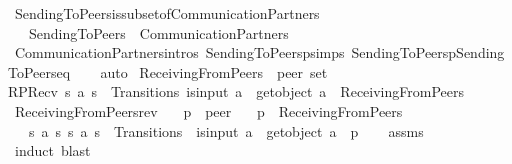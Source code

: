 \begin{isabellebody}
\ SendingToPeers{\isacharunderscore}{\kern0pt}is{\isacharunderscore}{\kern0pt}subset{\isacharunderscore}{\kern0pt}of{\isacharunderscore}{\kern0pt}CommunicationPartners{\isacharcolon}{\kern0pt}\isanewline
\ \ \ {\isachardoublequoteopen}SendingToPeers\ {\isasymsubseteq}\ CommunicationPartners{\isachardoublequoteclose}\isanewline
%
\isadelimproof
\ \ %
\endisadelimproof
%
\isatagproof
{}\isamarkupfalse%
\ CommunicationPartners{\isachardot}{\kern0pt}intros\ SendingToPeersp{\isachardot}{\kern0pt}simps\ SendingToPeersp{\isacharunderscore}{\kern0pt}SendingToPeers{\isacharunderscore}{\kern0pt}eq\isanewline
\ \ \isamarkupfalse%
\ auto%
\endisatagproof
{\isafoldproof}%
%
\isadelimproof
\isanewline
%
\endisadelimproof
\isanewline
{}\isamarkupfalse%
\ ReceivingFromPeers\ {\isacharcolon}{\kern0pt}{\isacharcolon}{\kern0pt}\ {\isachardoublequoteopen}{\isacharprime}{\kern0pt}peer\ set{\isachardoublequoteclose}\ \isanewline
RPRecv{\isacharcolon}{\kern0pt}\ {\isachardoublequoteopen}{\isasymlbrakk}{\isacharparenleft}{\kern0pt}s{}{\isacharcomma}{\kern0pt}\ a{\isacharcomma}{\kern0pt}\ s{}{\isacharparenright}{\kern0pt}\ {\isasymin}\ Transitions{\isacharsemicolon}{\kern0pt}\ is{\isacharunderscore}{\kern0pt}input\ a{\isasymrbrakk}\ {\isasymLongrightarrow}\ get{\isacharunderscore}{\kern0pt}object\ a\ {\isasymin}\ ReceivingFromPeers{\isachardoublequoteclose}\isanewline
\isanewline
{}\isamarkupfalse%
\ ReceivingFromPeers{\isacharunderscore}{\kern0pt}rev{\isacharcolon}{\kern0pt}\isanewline
\ \ \ p\ {\isacharcolon}{\kern0pt}{\isacharcolon}{\kern0pt}\ {\isachardoublequoteopen}{\isacharprime}{\kern0pt}peer{\isachardoublequoteclose}\isanewline
\ \ \ {\isachardoublequoteopen}p\ {\isasymin}\ ReceivingFromPeers{\isachardoublequoteclose}\isanewline
\ \ \ {\isachardoublequoteopen}{\isasymexists}s{}\ a\ s{}{\isachardot}{\kern0pt}\ {\isacharparenleft}{\kern0pt}s{}{\isacharcomma}{\kern0pt}\ a{\isacharcomma}{\kern0pt}\ s{}{\isacharparenright}{\kern0pt}\ {\isasymin}\ Transitions\ {\isasymand}\ is{\isacharunderscore}{\kern0pt}input\ a\ {\isasymand}\ get{\isacharunderscore}{\kern0pt}object\ a\ {\isacharequal}{\kern0pt}\ p{\isachardoublequoteclose}\isanewline
%
\isadelimproof
\ \ %
\endisadelimproof
%
\isatagproof
{}\isamarkupfalse%
\ assms\isanewline
\ \ \isamarkupfalse%
\ {\isacharparenleft}{\kern0pt}induct{\isacharcomma}{\kern0pt}\ blast{\isacharparenright}{\kern0pt}%

\end{isabellebody}
